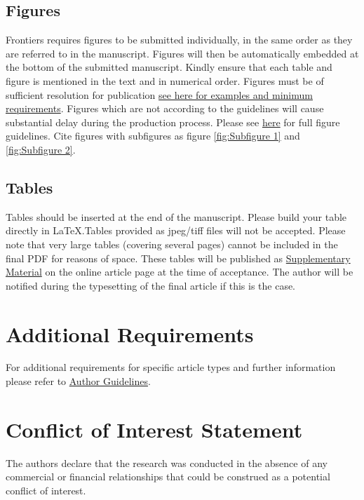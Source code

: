 \documentclass[utf8]{FrontiersinHarvard} %
\begin{document}
\subsection{Figures}
Frontiers requires figures to be submitted individually, in the same order as they are referred to in the manuscript. Figures will then be automatically embedded at the bottom of the submitted manuscript. Kindly ensure that each table and figure is mentioned in the text and in numerical order. Figures must be of sufficient resolution for publication \href{https://www.frontiersin.org/about/author-guidelines#ImageSizeRequirements}{see here for examples and minimum requirements}. Figures which are not according to the guidelines will cause substantial delay during the production process. Please see \href{https://www.frontiersin.org/about/author-guidelines#FigureRequirementsStyleGuidelines}{here} for full figure guidelines. Cite figures with subfigures as figure \ref{fig:Subfigure 1} and \ref{fig:Subfigure 2}.


\subsection{Tables}
Tables should be inserted at the end of the manuscript. Please build your table directly in LaTeX.Tables provided as jpeg/tiff files will not be accepted. Please note that very large tables (covering several pages) cannot be included in the final PDF for reasons of space. These tables will be published as \href{http://home.frontiersin.org/about/author-guidelines#SupplementaryMaterial}{Supplementary Material} on the online article page at the time of acceptance. The author will be notified during the typesetting of the final article if this is the case. 


\section{Additional Requirements}

For additional requirements for specific article types and further information please refer to \href{http://www.frontiersin.org/about/AuthorGuidelines#AdditionalRequirements}{Author Guidelines}.

\section*{Conflict of Interest Statement}
The authors declare that the research was conducted in the absence of any commercial or financial relationships that could be construed as a potential conflict of interest.
\end{document}
